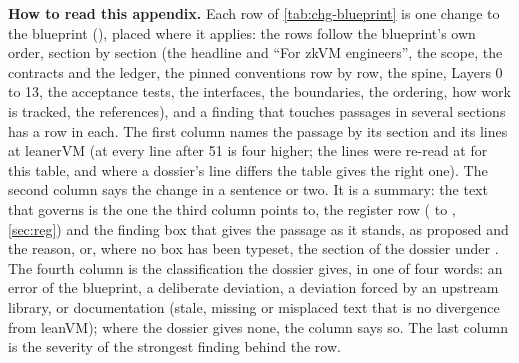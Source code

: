 \label{sec:chg}

\begin{sloppypar}\noindent\textbf{How to read this appendix.} Each row of \cref{tab:chg-blueprint} is one change to the
blueprint (), placed where it applies: the rows follow the
blueprint's own order, section by section (the headline and \enquote{For zkVM engineers}, the scope,
the contracts and the ledger, the pinned conventions row by row, the spine, Layers 0 to 13, the
acceptance tests, the interfaces, the boundaries, the ordering, how work is tracked, the
references), and a finding that touches passages in several sections has a row in each. The first
column names the passage by its section and its lines at leanerVM  (at 
every line after 51 is four higher; the lines were re-read at  for this table, and
where a dossier's line differs the table gives the right one). The second column says the change
in a sentence or two. It is a summary: the text that governs is the one the third column points
to, the register row ( to , \cref{sec:reg}) and the finding box that gives the
passage as it stands, as proposed and the reason, or, where no box has been typeset, the section
of the dossier under . The fourth column is the
classification the dossier gives, in one of four words: an error of the blueprint, a deliberate
deviation, a deviation forced by an upstream library, or documentation (stale, missing or
misplaced text that is no divergence from leanVM); where the dossier gives none, the column says
so. The last column is the severity of the strongest finding behind the row.\end{sloppypar}

